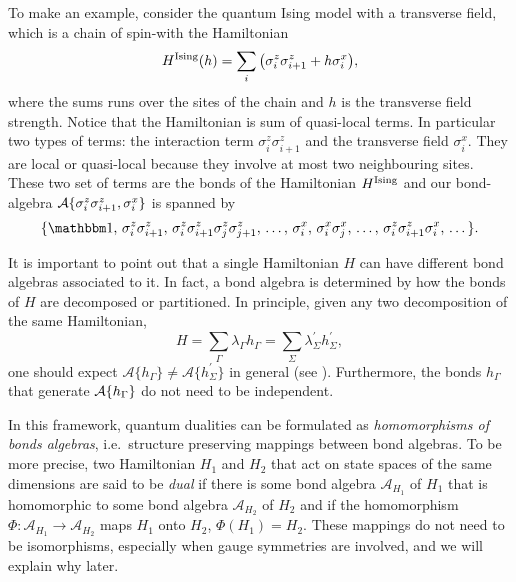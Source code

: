 To make an example, consider the quantum Ising model with a transverse field, which is a chain of spin-\onehalf with the Hamiltonian
\begin{equation}
    H^{\text{Ising}}(h) = \sum_{i} \qty( \sigma^z_i \sigma^z_{i+1} + h \sigma^x_i ),
\end{equation}
where the sums runs over the sites of the chain and $h$ is the transverse field strength.
Notice that the Hamiltonian is sum of quasi-local terms.
In particular two types of terms: the interaction term $\sigma^z_i \sigma^z_{i+1}$ and the transverse field $\sigma^x_i$.
They are local or quasi-local because they involve at most two neighbouring sites.
These two set of terms are the bonds of the Hamiltonian $H^{\text{Ising}}$ and our bond-algebra $\mathcal{A} \{\sigma^z_i \sigma^z_{i+1}, \sigma^x_i\}$ is spanned by
\begin{equation}
    \{
        \identity, \,
        \sigma^z_i \sigma^z_{i+1}, \,
        \sigma^z_i \sigma^z_{i+1} \sigma^z_j \sigma^z_{j+1}, \,
        \dots, \,
        \sigma^x_i, \,
        \sigma^x_i \sigma^x_j, \,
        \dots, \,
        \sigma^z_i \sigma^z_{i+1} \sigma^x_i, \,
        \dots
    \}.
\end{equation}


It is important to point out that a single Hamiltonian $H$ can have different bond algebras associated to it.
In fact, a bond algebra is determined by how the bonds of $H$ are decomposed or partitioned.
In principle, given any two decomposition of the same Hamiltonian,
\begin{equation*}
    H
    = \sum_{\Gamma} \lambda_{\Gamma} h_{\Gamma}
    = \sum_{\Sigma} \lambda^\prime_{\Sigma} h^\prime_{\Sigma},
\end{equation*}
one should expect $\mathcal{A}\{h_{\Gamma}\} \neq \mathcal{A}\{ h^{\prime}_{\Sigma} \}$ in general (see \cite{cobanera2011bond}).
Furthermore, the bonds $h_{\Gamma}$ that generate $\mathcal{A}\Bqty{ h_{\Gamma} }$ do not need to be independent.

In this framework, quantum dualities can be formulated as \emph{homomorphisms of bonds algebras}, i.e.~structure preserving mappings between bond algebras.
To be more precise, two Hamiltonian $H_1$ and $H_2$ that act on state spaces of the same dimensions are said to be \emph{dual} if there is some bond algebra $\mathcal{A}_{H_1}$ of $H_1$ that is homomorphic to some bond algebra $\mathcal{A}_{H_2}$ of $H_2$ and if the homomorphism $\Phi : \mathcal{A}_{H_1} \to \mathcal{A}_{H_2}$ maps $H_1$ onto $H_2$, $\Phi(H_1) = H_2$.
These mappings do not need to be isomorphisms, especially when gauge symmetries are involved, and we will explain why later.

